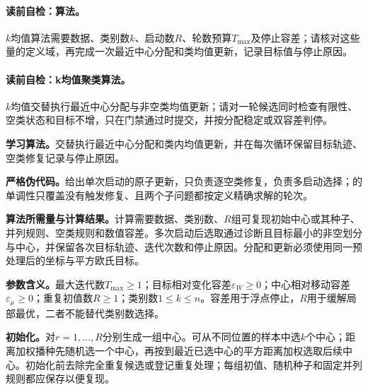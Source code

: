 \paragraph{读前自检：算法。}$k$均值算法需要数据、类别数$k$、启动数$R$、轮数预算$T_{\max}$及停止容差；请核对这些量的定义域，再完成一次最近中心分配和类均值更新，记录目标值与停止原因。\par
\paragraph{读前自检：k均值聚类算法。}$k$均值交替执行最近中心分配与非空类均值更新；请对一轮候选同时检查有限性、空类状态和目标不增，只在门禁通过时提交，并按分配稳定或双容差判停。\par

\label{struct:V4-C02-CH10}
\textbf{学习算法。}\kMeans{}交替执行最近中心分配和类内均值更新，并在每次循环保留目标轨迹、空类修复记录与停止原因。

\label{struct:V4-C02-CH19}
\textbf{严格伪代码。}给出单次启动的原子更新，只负责逐空类修复，负责多启动选择；的单调性只覆盖没有触发修复、且两个子问题都按定义精确求解的轮次。

\label{struct:V4-C02-CH20}
\textbf{算法所需量与计算结果。}计算需要数据、类别数、$R$组可复现初始中心或其种子、并列规则、空类规则和数值容差。多次启动后选取通过诊断且目标最小的非空划分与中心，并保留各次目标轨迹、迭代次数和停止原因。分配和更新必须使用同一预处理后的坐标与平方欧氏目标。

\label{struct:V4-C02-CH21}
\textbf{参数含义。}最大迭代数$T_{\max}\geq1$；目标相对变化容差$\varepsilon_W\geq0$；中心相对移动容差$\varepsilon_\mu\geq0$；重复初值数$R\geq1$；类别数$1\leq k\leq n$。容差用于浮点停止，$R$用于缓解局部最优，二者不能替代类别数选择。

\label{struct:V4-C02-CH22}
\textbf{初始化。}对$r=1,\ldots,R$分别生成一组中心。可从不同位置的样本中选$k$个中心；距离加权播种先随机选一个中心，再按到最近已选中心的平方距离加权选取后续中心。初始化前去除完全重复候选或登记重复处理；每组初值、随机种子和固定并列规则都应保存以便复现。

